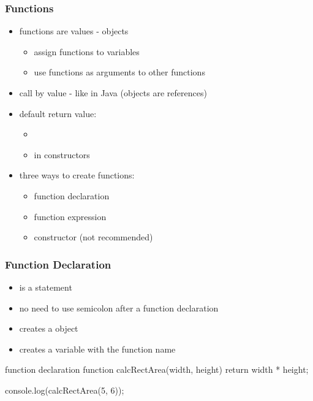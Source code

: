 \begin{frame}[fragile] \frametitle{Functions}

\begin{itemize}
  \item functions are values -  objects
  \begin{itemize}
    \item assign functions to variables
    \item use functions as arguments to other functions
  \end{itemize}
  \item call by value - like in Java (objects are references)
  \item default return value:
  \begin{itemize}
    \item {}
    \item {} in constructors
  \end{itemize}
  \item three ways to create functions:
  \begin{itemize}
    \item function declaration
    \item function expression
    \item {} constructor (not recommended)
  \end{itemize}
\end{itemize}

\end{frame}

\begin{frame}[fragile] \frametitle{Function Declaration}

\begin{itemize}
  \item is a statement
  \item no need to use semicolon after a function declaration
  \item creates a  object
  \item creates a variable with the function name
\end{itemize}
\begin{CodeBox}{function declaration}
function calcRectArea(width, height) {
  return width * height;
}

console.log(calcRectArea(5, 6));
\end{CodeBox}
\end{frame}

